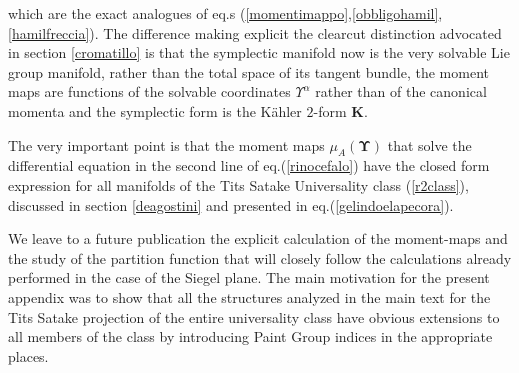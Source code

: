 \documentclass[10pt,a4paper]{article}
\begin{document}
 which are the exact analogues of eq.s (\ref{momentimappo},\ref{obbligohamil},\ref{hamilfreccia}). The difference making explicit the
 clearcut distinction advocated in section \ref{cromatillo} is that the symplectic manifold now is the very solvable Lie group manifold, rather than the total space of its tangent bundle, the moment maps are functions of the solvable coordinates $\Upsilon^\alpha$ rather than of the canonical momenta and the symplectic form is the K\"ahler $2$-form $\mathbf{K}$.
 \par
 The very important point is that the moment maps $\mu_A(\boldsymbol{\Upsilon})$ that solve the differential equation in the second line of eq.(\ref{rinocefalo}) have the closed form expression for all manifolds of the Tits Satake Universality class (\ref{r2class}), discussed in section \ref{deagostini} and presented in eq.(\ref{gelindoelapecora}).
 \par
We leave to a future publication the explicit calculation of the moment-maps and the study of the partition function that will closely follow the calculations already performed in the case of the Siegel plane. The main motivation for the present appendix was to show that all the structures analyzed in the main text for the Tits Satake projection of the entire universality class have obvious extensions to all members of the class by introducing Paint Group indices in the appropriate places.
\vspace{6pt}
\newpage
\end{document}
